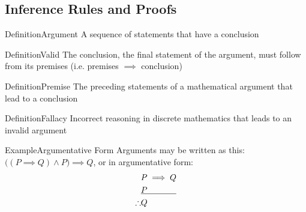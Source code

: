 \documentclass{MathNotes}
\newenvironment{example}[1]{\begin{BlueBox}{Example}{#1}}{\end{BlueBox}}
\newenvironment{definition}[1]{\begin{RedBox}{Definition}{#1}}{\end{RedBox}}
\begin{document}
\subsection{Inference Rules and Proofs}
\begin{multicols}{2}
	\begin{definition}{Argument}\label{def:argument}
		A sequence of statements that have a conclusion
	\end{definition}

	\begin{definition}{Valid}\label{def:valid}
		The conclusion, the final statement of the argument, must follow from its premises
		\newline
		(i.e. premises $\implies$ conclusion)
	\end{definition}

	\begin{definition}{Premise}\label{def:premise}
		The preceding statements of a mathematical argument that lead to a conclusion
	\end{definition}

	\begin{definition}{Fallacy}
		Incorrect reasoning in discrete mathematics that leads to an invalid argument
	\end{definition}
\end{multicols}


\begin{example}{Argumentative Form}\label{ex:argumentative-form}
	Arguments may be written as this: $\big((P\implies Q)\land P\big)\implies Q$, or in argumentative form:
	\begin{align*}
		           & P\implies Q                 \\
		           & \underline{P\hspace{3.5em}} \\
		\therefore & Q
	\end{align*}
\end{example}
\end{document}
